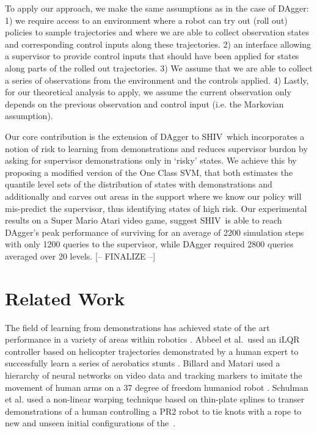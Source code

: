 \documentclass[10pt, conference]{ieeeconf}      %
\newcommand{\acro}{SHIV}
\begin{document}
To apply our approach, we make the same assumptions as in the case of DAgger: 1) we require access to an environment
where a robot can try out (roll out) policies to sample trajectories and where we are able to collect observation states
and corresponding control inputs along these trajectories. 2) an interface allowing a supervisor to provide control
inputs that should have been applied for states along parts of the rolled out trajectories. 3) We assume that we are
able to collect a series of observations from the environment and the controls applied. 4) Lastly, for our theoretical
analysis to apply, we assume the current observation only depends on the previous observation and control input (i.e.
the Markovian assumption).

Our core contribution is the extension of DAgger to \acro~which incorporates a notion of risk to learning from
demonstrations and reduces supervisor
burdon by asking for supervisor demonstrations only in `risky' states. 
We achieve this by proposing a modified version of the One Class SVM, that both estimates the quantile level sets 
of the distribution of states with demonstrations and additionally
and carves out areas in the support where we know our policy will mis-predict the supervisor, thus identifying states of high
risk.  Our experimental results on a Super Mario Atari video game,  suggest \acro~is able to reach DAgger's
peak performance of surviving for an average of 2200 simulation steps with only 1200 queries to the supervisor, while DAgger required 2800 queries
averaged over 20 levels.
{\color{blue}[-- FINALIZE --]}

\section{Related Work}
The field of learning from demonstrations has achieved state of the art performance in a variety of areas within robotics
\cite{argall2009survey}. Abbeel et al.~used an iLQR controller based on helicopter trajectories demonstrated by a human expert
to successfully learn a series of aerobatics stunts \cite{abbeel2007application}. Billard and Matari used a hierarchy of
neural networks on video data and tracking markers to imitate the movement of human arms on a 37 degree of freedom humaniod
robot \cite{billard2001learning}. Schulman et al. used a non-linear warping technique based on thin-plate splines
to transer demonstrations of a human controlling a PR2 robot to tie knots with a rope to new and unseen initial
configurations of the~\cite{schulman2013case}. 
\end{document}
